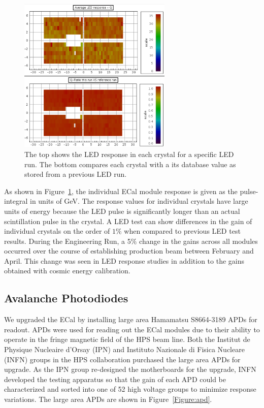 \begin{figure}[htb]
  \centering
      \includegraphics[width=0.65\textwidth]{pics/experiment/ledCompare.png}
  \caption[Results of a single LED run]{The top shows the LED response in each crystal for a specific LED run. The bottom compares each crystal with a its database value as stored from a previous LED run.}
  \label{Figure:redCompare}
\end{figure}

As shown in Figure~\ref{Figure:redCompare}, the individual ECal module response is given as the pulse-integral in units of GeV. The response values for individual crystals have large units of energy because the LED pulse is significantly longer than an actual scintillation pulse in the crystal. A LED test can show differences in the gain of individual crystals on the order of $1\%$ when compared to previous LED test results. During the Engineering Run, a 5$\%$ change in the gains across all modules occurred over the course of establishing production beam between February and April. This change was seen in LED response studies in addition to the gains obtained with cosmic energy calibration.

\subsection{Avalanche Photodiodes}


We upgraded the ECal by installing large area Hamamatsu S8664-3189 APDs for readout. APDs were used for reading out the ECal modules due to their ability to operate in the fringe magnetic field of the HPS beam line. Both the Institut de Physique Nucleaire d'Orsay (IPN) and Instituto Nazionale di Fisica Nucleare (INFN) groups in the HPS collaboration purchased the large area APDs for upgrade. As the IPN group re-designed the motherboards for the upgrade, INFN developed the testing apparatus so that the gain of each APD could be characterized and sorted into one of 52 high voltage groups to minimize response variations. The large area APDs are shown in Figure~\ref{Figure:apd}.

